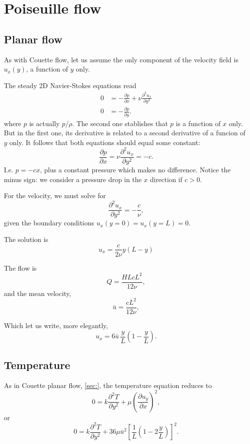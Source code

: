 \section{Poiseuille flow}

\subsection{Planar flow}

As with Couette flow, let us assume the only component
of the velocity field is $u_x(y)$, a function of $y$ only.

The steady 2D Navier-Stokes equations read
\begin{align}
  0 & =   - \frac{\partial p}{\partial x} +
  \nu
  \frac{\partial^2 u_x}{\partial y^2}
   \\
  0 &=   - \frac{\partial p}{\partial y} .
\end{align}
where $p$ is actually $p/\rho$. The second one stablishes that $p$ is
a function of $x$ only. But in the first one, its derivative is
related to a second derivative of a funcion of $y$ only. It follows
that both equations should equal some constant:
\[
\frac{\partial p}{\partial x} =
 \nu
  \frac{\partial^2 u_x}{\partial y^2} = -c .
\]
I.e. $p= - c x$, plus a constant pressure which makes no
difference. Notice the minus sign: we consider a pressure drop in
the $x$ direction if $c > 0$.

For the velocity, we must solve for
\[
  \frac{\partial^2 u_x}{\partial y^2} = -\frac{c}{\nu} ,
\]
given the boundary conditions $u_x(y=0)=u_x(y=L)=0$.

The solution is
\begin{equation}
  \label{eq:Poiseuille_u}
  u_x=\frac{c}{2\nu} y (L-y)  
\end{equation}

The flow is
\[
Q= \frac{HL c L^2}{12\nu} ,
\]
and the mean velocity,
\[
\bar{u}= \frac{c L^2}{12\nu} ,
\]

Which let us write, more elegantly,
\[
u_x=6 \bar{u} \,  \frac{y}{L} \left( 1- \frac{y}{L}\right). 
\]


\subsection{Temperature}

As in Couette planar flow, \ref{sec:}, the temperature equation
reduces to
\[
0 =  k \frac{\partial^2 T}{\partial y^2} +
\mu  \left( \frac{\partial u_y}{\partial x} \right)^2,
\]
or
\[
0 =  k \frac{\partial^2 T}{\partial y^2} +
36 \mu \bar{u}^2 \left[
  \frac{1}{L} \left( 1- 2 \frac{y}{L}  \right)
  \right]^2 .
\]

